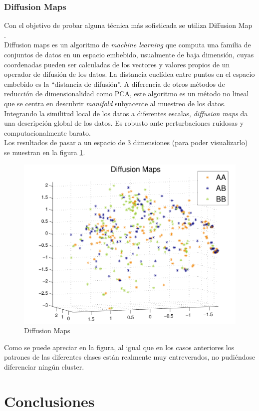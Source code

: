 \documentclass[12pt,a4paper,titlepage]{report}
\begin{document}
\subsection{Diffusion Maps}
Con el objetivo de probar alguna técnica más sofisticada se utiliza Diffusion Map \cite{bib:diffmap}.\\

Diffusion maps es un algoritmo de \emph{machine learning} que computa una familia de conjuntos de datos en un espacio embebido, usualmente de baja dimensión, cuyas coordenadas pueden ser calculadas de los vectores y valores propios de un operador de difusión de los datos. La distancia euclídea entre puntos en el espacio embebido es la ``distancia de difusión''. A diferencia de otros métodos de reducción de dimensionalidad como PCA, este algoritmo es un método no lineal que se centra en descubrir \emph{manifold} subyacente al muestreo de los datos. Integrando la similitud local de los datos a diferentes escalas, \emph{diffusion maps} da una descripción global de los datos. Es robusto ante perturbaciones ruidosas y computacionalmente barato.\\

Los resultados de pasar a un espacio de 3 dimensiones (para poder visualizarlo) se muestran en la figura \ref{fig:dm}.
\begin{figure}[H]
	\centering 
	\includegraphics[width=.8\textwidth]{./pics/dm.pdf}
	\caption{Diffusion Maps}
	\label{fig:dm}
\end{figure}

Como se puede apreciar en la figura, al igual que en los casos anteriores los patrones de las diferentes clases están realmente muy entreverados, no pudiéndose diferenciar ningún cluster.


\chapter{Conclusiones}
\end{document}
